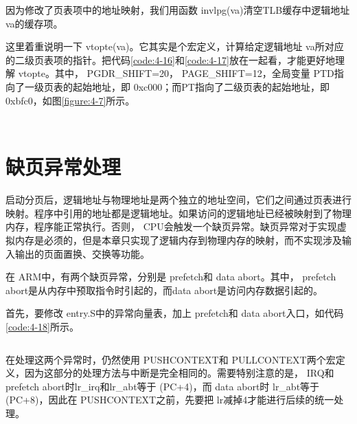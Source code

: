 \documentclass[main.tex]{subfiles}
\begin{document}
\begin{CJK*}{UTF8}{song}
\noindent
因为修改了页表项中的地址映射，我们用函数 invlpg(va)清空TLB缓存中逻辑地址 va的缓存项。

\par
这里着重说明一下 vtopte(va)。它其实是个宏定义，计算给定逻辑地址 va所对应的二级页表项的指针。把代码\ref{code:4-16}和\ref{code:4-17}放在一起看，才能更好地理解 vtopte。其中， PGDR\_\-SHIFT=20， PAGE\_\-SHIFT=12，全局变量 PTD指向了一级页表的起始地址，即 0xc000；而PT指向了二级页表的起始地址，即 0xbfc0，如图\ref{figure:4-7}所示。

\begin{code}
\label{code:4-16}
\inputminted[firstline=38,lastline=48,linenos,numbersep=5pt,frame=lines,framesep=2mm]{c}{src/chapter04/kernel/kernel.h}
\end{code}

\begin{code}
\label{code:4-17}
\inputminted[firstline=13,lastline=14,linenos,numbersep=5pt,frame=lines,framesep=2mm]{c}{src/chapter04/kernel/kernel.c}
\end{code}

\section{缺页异常处理}\label{section:page-fault}
启动分页后，逻辑地址与物理地址是两个独立的地址空间，它们之间通过页表进行映射。程序中引用的地址都是逻辑地址。如果访问的逻辑地址已经被映射到了物理内存，程序能正常执行。否则， CPU会触发一个缺页异常。缺页异常对于实现虚拟内存是必须的，但是本章只实现了逻辑内存到物理内存的映射，而不实现涉及输入输出的页面置换、交换等功能。

\par
在 ARM中，有两个缺页异常，分别是 pre\-fetch和 data abort。其中， pre\-fetch abort是从内存中预取指令时引起的，而data abort是访问内存数据引起的。

\par
首先，要修改 entry.S中的异常向量表，加上 pre\-fetch和 data abort入口，如代码\ref{code:4-18}所示。

\begin{code}
\label{code:4-18}
\inputminted[firstline=91,lastline=106,linenos,numbersep=5pt,frame=lines,framesep=2mm]{gas}{src/chapter04/kernel/entry.S}
\end{code}

在处理这两个异常时，仍然使用 PUSH\-CONTEXT和 PULL\-CONTEXT两个宏定义，因为这部分的处理方法与中断是完全相同的。需要特别注意的是， IRQ和 pre\-fetch abort时lr\_\-irq和lr\_\-abt等于 (PC+4)，而 data abort时 lr\_\-abt等于 (PC+8)，因此在 PUSH\-CONTEXT之前，先要把 lr减掉4才能进行后续的统一处理。


\end{CJK*}
\end{document}
